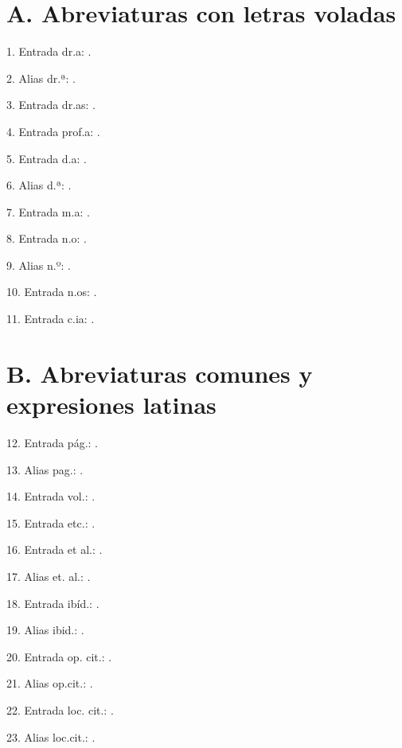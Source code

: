 \documentclass{article}
\begin{document}
\section*{A. Abreviaturas con letras voladas}

1. Entrada dr.a: .

2. Alias dr.ª: .

3. Entrada dr.as: .

4. Entrada prof.a: .

5. Entrada d.a: .

6. Alias d.ª: .

7. Entrada m.a: .

8. Entrada n.o: .

9. Alias n.º: .

10. Entrada n.os: .

11. Entrada c.ia: .

\section*{B. Abreviaturas comunes y expresiones latinas}

12. Entrada pág.: .

13. Alias pag.: .

14. Entrada vol.: .

15. Entrada etc.: .

16. Entrada et al.: .

17. Alias et. al.: .

18. Entrada ibíd.: .

19. Alias ibid.: .

20. Entrada op. cit.: .

21. Alias op.cit.: .

22. Entrada loc. cit.: .

23. Alias loc.cit.: .
\end{document}
